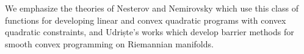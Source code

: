 \begin{remark}
  {
    \rm We emphasize the theories of Nesterov and Nemirovsky which
    use this class of functions for developing linear and convex quadratic
    programs with convex quadratic constraints, and Udriște's works
    which develop barrier methods for smooth convex
    programming on Riemannian manifolds.
  }
\end{remark}

